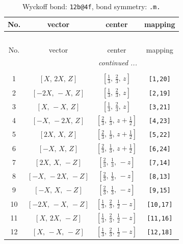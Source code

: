 \documentclass[fleqn,8pt]{jsarticle}
\begin{document}
\begin{longtable}{cccc}
\caption{Wyckoff bond: {\tt 12b@4f}, bond symmetry: {\tt .m.}}
 \\
 \hline \hline
No. & vector & center & mapping \\ \hline \endfirsthead

\multicolumn{3}{l}{\tablename\ \thetable{}} \\
 \hline \hline
No. & vector & center & mapping \\ \hline \endhead

 \hline \hline
\multicolumn{3}{r}{\footnotesize\it continued ...} \\ \endfoot

 \hline \hline
\multicolumn{3}{r}{} \\ \endlastfoot

1 & $\left[ X,\, 2 X,\, Z \right]$ & $\left[ \frac{1}{3},\, \frac{2}{3},\, z \right]$ & {\tt [1,20]} \\ \hline
2 & $\left[ - 2 X,\, - X,\, Z \right]$ & $\left[ \frac{1}{3},\, \frac{2}{3},\, z \right]$ & {\tt [2,19]} \\ \hline
3 & $\left[ X,\, - X,\, Z \right]$ & $\left[ \frac{1}{3},\, \frac{2}{3},\, z \right]$ & {\tt [3,21]} \\ \hline
4 & $\left[ - X,\, - 2 X,\, Z \right]$ & $\left[ \frac{2}{3},\, \frac{1}{3},\, z + \frac{1}{2} \right]$ & {\tt [4,23]} \\ \hline
5 & $\left[ 2 X,\, X,\, Z \right]$ & $\left[ \frac{2}{3},\, \frac{1}{3},\, z + \frac{1}{2} \right]$ & {\tt [5,22]} \\ \hline
6 & $\left[ - X,\, X,\, Z \right]$ & $\left[ \frac{2}{3},\, \frac{1}{3},\, z + \frac{1}{2} \right]$ & {\tt [6,24]} \\ \hline
7 & $\left[ 2 X,\, X,\, - Z \right]$ & $\left[ \frac{2}{3},\, \frac{1}{3},\, - z \right]$ & {\tt [7,14]} \\ \hline
8 & $\left[ - X,\, - 2 X,\, - Z \right]$ & $\left[ \frac{2}{3},\, \frac{1}{3},\, - z \right]$ & {\tt [8,13]} \\ \hline
9 & $\left[ - X,\, X,\, - Z \right]$ & $\left[ \frac{2}{3},\, \frac{1}{3},\, - z \right]$ & {\tt [9,15]} \\ \hline
10 & $\left[ - 2 X,\, - X,\, - Z \right]$ & $\left[ \frac{1}{3},\, \frac{2}{3},\, \frac{1}{2} - z \right]$ & {\tt [10,17]} \\ \hline
11 & $\left[ X,\, 2 X,\, - Z \right]$ & $\left[ \frac{1}{3},\, \frac{2}{3},\, \frac{1}{2} - z \right]$ & {\tt [11,16]} \\ \hline
12 & $\left[ X,\, - X,\, - Z \right]$ & $\left[ \frac{1}{3},\, \frac{2}{3},\, \frac{1}{2} - z \right]$ & {\tt [12,18]} \\
\end{longtable}
\end{document}

